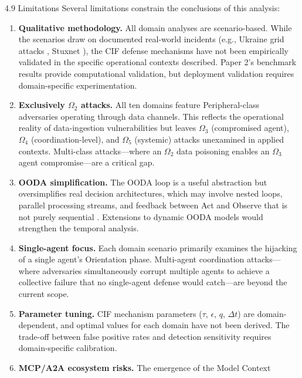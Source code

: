 \documentclass[
  ignorenonframetext,
]{beamer}
\begin{document}
\begin{frame}[allowframebreaks]{4.9 Limitations}
\protect{}\label{sec:limitations_discussion}
Several limitations constrain the conclusions of this analysis:

\begin{enumerate}
\item
  \textbf{Qualitative methodology.} All domain analyses are
  scenario-based. While the scenarios draw on documented real-world
  incidents (e.g., Ukraine grid attacks \cite{liang2017review}, Stuxnet
  \cite{langner2011stuxnet}), the CIF defense mechanisms have not been
  empirically validated in the specific operational contexts described.
  Paper 2's benchmark results \cite{friedman2026cogsec2} provide
  computational validation, but deployment validation requires
  domain-specific experimentation.
\item
  \textbf{Exclusively \(\Omega_2\) attacks.} All ten domains feature
  Peripheral-class adversaries operating through data channels. This
  reflects the operational reality of data-ingestion vulnerabilities but
  leaves \(\Omega_3\) (compromised agent), \(\Omega_4\)
  (coordination-level), and \(\Omega_5\) (systemic) attacks unexamined
  in applied contexts. Multi-class attacks---where an \(\Omega_2\) data
  poisoning enables an \(\Omega_3\) agent compromise---are a critical
  gap.
\item
  \textbf{OODA simplification.} The OODA loop is a useful abstraction
  but oversimplifies real decision architectures, which may involve
  nested loops, parallel processing streams, and feedback between Act
  and Observe that is not purely sequential \cite{brehmer2005dynamic}.
  Extensions to dynamic OODA models would strengthen the temporal
  analysis.
\item
  \textbf{Single-agent focus.} Each domain scenario primarily examines
  the hijacking of a single agent's Orientation phase. Multi-agent
  coordination attacks---where adversaries simultaneously corrupt
  multiple agents to achieve a collective failure that no single-agent
  defense would catch---are beyond the current scope.
\item
  \textbf{Parameter tuning.} CIF mechanism parameters (\(\tau\),
  \(\epsilon\), \(q\), \(\Delta t\)) are domain-dependent, and optimal
  values for each domain have not been derived. The trade-off between
  false positive rates and detection sensitivity requires
  domain-specific calibration.
\item
  \textbf{MCP/A2A ecosystem risks.} The emergence of the Model Context

\end{enumerate}
\end{frame}
\end{document}

